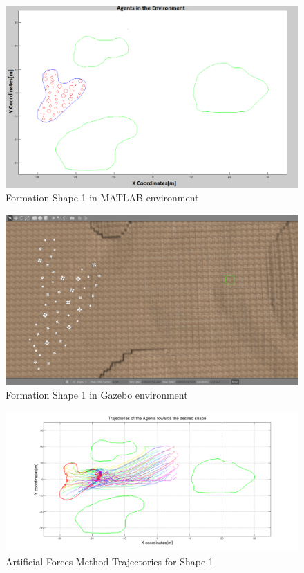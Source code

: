 \begin{figure}[H]
\caption{Formation Shape 1 in MATLAB environment}
\centerline{\includegraphics[scale = 0.32]{Trajectories_Formation_Shape_1_2}}
\end{figure} 	
			
\begin{figure}[H]
\caption{Formation Shape 1 in Gazebo environment}
\centerline{\includegraphics[scale = 0.32]{Trajectories_Formation_Shape_1_1}}
\end{figure} 	
		
\begin{figure}[H]
\caption{Artificial Forces Method Trajectories for Shape 1}
\centerline{\includegraphics[scale = 0.32]{Aritificial_Trajecories_1}}
\end{figure} 	

